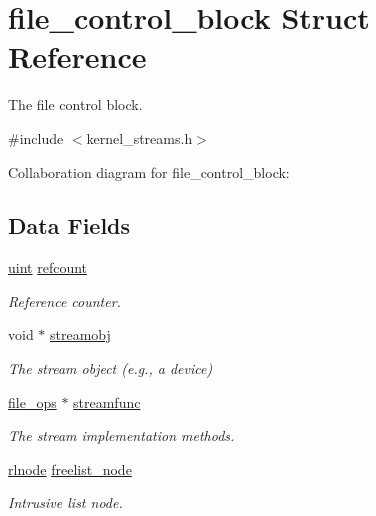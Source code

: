 \hypertarget{structfile__control__block}{}\section{file\+\_\+control\+\_\+block Struct Reference}
\label{structfile__control__block}


The file control block.  




{\ttfamily \#include $<$kernel\+\_\+streams.\+h$>$}



Collaboration diagram for file\+\_\+control\+\_\+block\+:
\subsection*{Data Fields}
\begin{DoxyCompactItemize}
\item 
\hyperlink{bios_8h_a91ad9478d81a7aaf2593e8d9c3d06a14}{uint} \hyperlink{structfile__control__block_a629271d79f15500a74096ec65a4adedb}{refcount}\hypertarget{structfile__control__block_a629271d79f15500a74096ec65a4adedb}{}\label{structfile__control__block_a629271d79f15500a74096ec65a4adedb}

\begin{DoxyCompactList}\small\item\em Reference counter. \end{DoxyCompactList}\item 
void $\ast$ \hyperlink{structfile__control__block_a1460eb54b4a65e747b9b9ec3f6a798d6}{streamobj}\hypertarget{structfile__control__block_a1460eb54b4a65e747b9b9ec3f6a798d6}{}\label{structfile__control__block_a1460eb54b4a65e747b9b9ec3f6a798d6}

\begin{DoxyCompactList}\small\item\em The stream object (e.\+g., a device) \end{DoxyCompactList}\item 
\hyperlink{group__dev_gaab625d8ae3a95e942ed10ed1579f5042}{file\+\_\+ops} $\ast$ \hyperlink{structfile__control__block_aa49f26d3baceeb074fa00f9e5caf978b}{streamfunc}\hypertarget{structfile__control__block_aa49f26d3baceeb074fa00f9e5caf978b}{}\label{structfile__control__block_aa49f26d3baceeb074fa00f9e5caf978b}

\begin{DoxyCompactList}\small\item\em The stream implementation methods. \end{DoxyCompactList}\item 
\hyperlink{group__rlists_ga8f6244877f7ce2322c90525217ea6e7a}{rlnode} \hyperlink{structfile__control__block_ac84640123f400fa3fe3cb64df08e6bd6}{freelist\+\_\+node}\hypertarget{structfile__control__block_ac84640123f400fa3fe3cb64df08e6bd6}{}\label{structfile__control__block_ac84640123f400fa3fe3cb64df08e6bd6}

\begin{DoxyCompactList}\small\item\em Intrusive list node. \end{DoxyCompactList}\end{DoxyCompactItemize}


